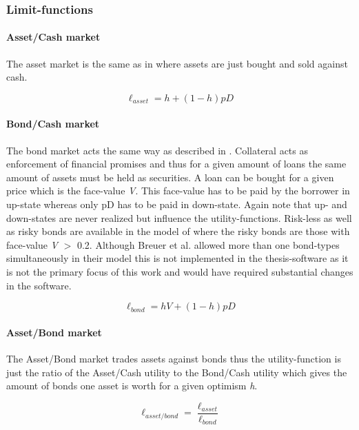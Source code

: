 \documentclass[../Bachelorarbeit.tex]{subfiles}
\begin{document}
\subsubsection{Limit-functions}
\paragraph{Asset/Cash market}
The asset market is the same as in \cite{Geanakoplos2009} where assets are just bought and sold against cash.

\begin{equation}
\ell_{asset} = h + ( 1 - h )pD
\end{equation}

\paragraph{Bond/Cash market}
The bond market acts the same way as described in \cite{Geanakoplos2009}. Collateral acts as enforcement of financial promises and thus for a given amount of loans the same amount of assets must be held as securities. A loan can be bought for a given price which is the face-value \textit{V}. This face-value has to be paid by the borrower in up-state whereas only pD has to be paid in down-state. Again note that up- and down-states are never realized but influence the utility-functions.
\medskip
Risk-less as well as risky bonds are available in the model of \cite{Breuer2015} where the risky bonds are those with face-value \textit{V} $>$ 0.2. Although Breuer et al. allowed more than one bond-types simultaneously in their model this is not implemented in the thesis-software as it is not the primary focus of this work and would have required substantial changes in the software.

\begin{equation}
\ell_{bond} = h V + ( 1 - h )pD
\end{equation}

\paragraph{Asset/Bond market}
The Asset/Bond market trades assets against bonds thus the utility-function is just the ratio of the Asset/Cash utility to the Bond/Cash utility which gives the amount of bonds one asset is worth for a given optimism \textit{h}.

\begin{equation}
\ell_{asset/bond} = \frac{\ell_{asset}}{\ell_{bond}}
\end{equation}
\end{document}
